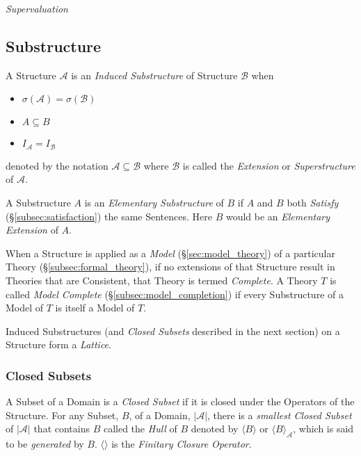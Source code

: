 \documentclass{article}
\begin{document}
\emph{Supervaluation}

\subsection{Substructure}\label{subsec:model_substructure}

A Structure $\mathcal{A}$ is an \emph{Induced Substructure} of
Structure $\mathcal{B}$ when
\begin{itemize}
\item $\sigma(\mathcal{A}) = \sigma(\mathcal{B})$
\item $A \subseteq B$
\item $I_{\mathcal{A}}=I_{\mathcal{B}}$
\end{itemize}
denoted by the notation $\mathcal{A} \subseteq \mathcal{B}$ where
$\mathcal{B}$ is called the \emph{Extension} or \emph{Superstructure}
of $\mathcal{A}$.

A Substructure $A$ is an \emph{Elementary Substructure} of $B$ if $A$
and $B$ both \emph{Satisfy} (\S\ref{subsec:satisfaction}) the same
Sentences. Here $B$ would be an \emph{Elementary Extension} of $A$.

When a Structure is applied as a \emph{Model}
(\S\ref{sec:model_theory}) of a particular Theory
(\S\ref{subsec:formal_theory}), if no extensions of that Structure
result in Theories that are Consistent, that Theory is termed
\emph{Complete}. A Theory $T$ is called \emph{Model Complete}
(\S\ref{subsec:model_completion}) if every Substructure of a Model of
$T$ is itself a Model of $T$.

Induced Substructures (and \emph{Closed Subsets} described in the next
section) on a Structure form a \emph{Lattice}.

\subsubsection{Closed Subsets}

A Subset of a Domain is a \emph{Closed Subset} if it is closed under
the Operators of the Structure. For any Subset, $B$, of a Domain,
$|\mathcal{A}|$, there is a \emph{smallest Closed Subset} of
$|\mathcal{A}|$ that contains $B$ called the \emph{Hull} of $B$
denoted by $\langle B \rangle$ or $\langle B \rangle_{\mathcal{A}}$,
which is said to be \emph{generated} by $B$. $\langle \rangle$ is the
\emph{Finitary Closure Operator}.
\end{document}
